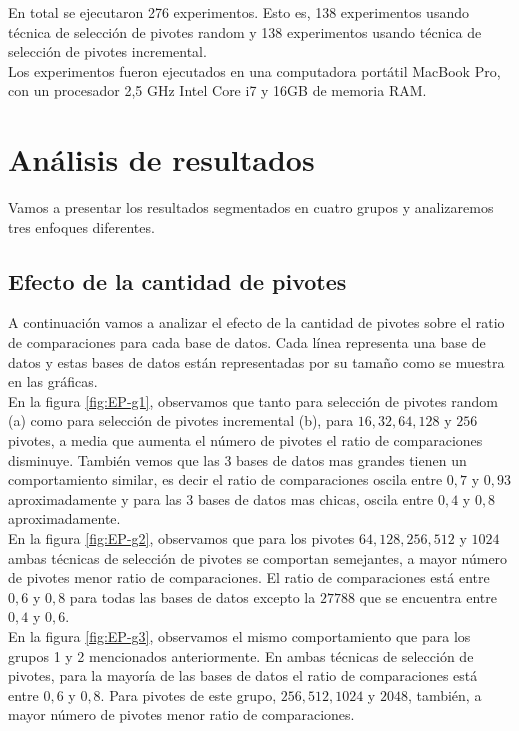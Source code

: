 En total se ejecutaron 276 experimentos. Esto es, 138 experimentos usando t\'ecnica de selecci\'on de pivotes random y 138 experimentos usando t\'ecnica de selecci\'on de pivotes incremental.\\

Los experimentos fueron ejecutados en una computadora port\'atil MacBook Pro, con un procesador 2,5 GHz Intel Core i7 y 16GB de memoria RAM.

\section{An\'alisis de resultados}

Vamos a presentar los resultados segmentados en cuatro grupos y analizaremos tres enfoques diferentes.\\

\subsection{Efecto de la cantidad de pivotes}

A continuaci\'on vamos a analizar el efecto de la cantidad de pivotes sobre el ratio de comparaciones para cada base de datos. Cada l\'inea representa una base de datos y estas bases de datos est\'an representadas por su tamaño como se muestra en las gr\'aficas.\\

En la figura \ref{fig:EP-g1}, observamos que tanto para selecci\'on de pivotes random (a) como para selecci\'on de pivotes incremental (b), para $16, 32, 64, 128$ y $256$ pivotes, a media que aumenta el n\'umero de pivotes el ratio de comparaciones disminuye. Tambi\'en vemos que las 3 bases de datos mas grandes tienen un comportamiento similar, es decir el ratio de comparaciones oscila entre $0,7$ y $0,93$ aproximadamente y para las 3 bases de datos mas chicas, oscila entre $0,4$ y $0,8$ aproximadamente.\\

En la figura \ref{fig:EP-g2}, observamos que para los pivotes $64, 128, 256, 512$ y $1024$ ambas t\'ecnicas de selecci\'on de pivotes se comportan semejantes, a mayor n\'umero de pivotes menor ratio de comparaciones. El ratio de comparaciones est\'a entre $0,6$ y $0,8$ para todas las bases de datos excepto la $27788$ que se encuentra entre $0,4$ y $0,6$.\\

En la figura \ref{fig:EP-g3}, observamos el mismo comportamiento que para los grupos 1 y 2 mencionados anteriormente. En ambas t\'ecnicas de selecci\'on de pivotes, para la mayor\'ia de las bases de datos el ratio de comparaciones est\'a entre $0,6$ y $0,8$. Para pivotes de este grupo, $256, 512, 1024$ y $2048$, tambi\'en, a mayor n\'umero de pivotes menor ratio de comparaciones.\\

